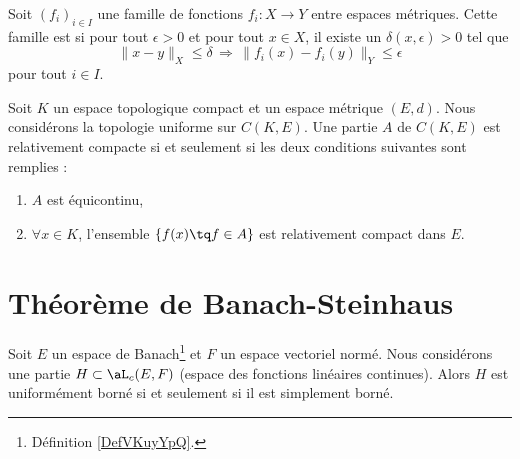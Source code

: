 \begin{definition}  \label{DefUWmVBcZ}
    Soit \( (f_i)_{i\in I}\) une famille de fonctions \( f_i\colon X\to Y\) entre espaces métriques. Cette famille est  si pour tout \( \epsilon>0\) et pour tout \( x\in X\), il existe un \( \delta(x,\epsilon)>0\) tel que 
    \begin{equation}
        \| x-y \|_X\leq \delta\,\Rightarrow\,\| f_i(x)-f_i(y) \|_Y\leq \epsilon
    \end{equation}
    pour tout \( i\in I\).
\end{definition}

\begin{theorem}        \label{ThoKRbtpah}
    Soit \( K\) un espace topologique compact et un espace métrique \( (E,d)\). Nous considérons la topologie uniforme sur \( C(K,E)\). Une partie \( A\) de \( C(K,E)\) est relativement compacte si et seulement si les deux conditions suivantes sont remplies :
    \begin{enumerate}
        \item
            \( A\) est équicontinu,
        \item
            \( \forall x\in K\), l'ensemble \( \{ f(x)\tq f\in A \}\) est relativement compact dans \( E\).
    \end{enumerate}
\end{theorem}

\section{Théorème de Banach-Steinhaus}

\begin{theorem} \label{ThoPFBMHBN}
    Soit \( E\) un espace de Banach\footnote{Définition \ref{DefVKuyYpQ}.} et \( F\) un espace vectoriel normé. Nous considérons une partie \( H\subset \aL_c(E,F)\) (espace des fonctions linéaires continues). Alors \( H\) est uniformément borné si et seulement si il est simplement borné.
\end{theorem}


